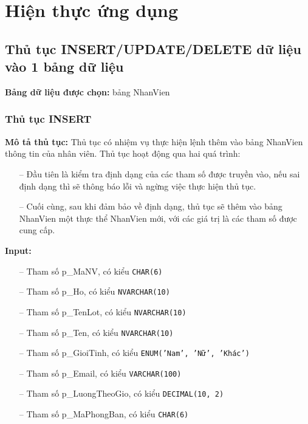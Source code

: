 \section{Hiện thực ứng dụng}
\subsection{Thủ tục INSERT/UPDATE/DELETE dữ liệu vào 1 bảng dữ liệu}
\textbf{Bảng dữ liệu được chọn:} bảng NhanVien 
\subsubsection{Thủ tục INSERT}

\textbf{Mô tả thủ tục:} Thủ tục có nhiệm vụ thực hiện lệnh thêm vào bảng NhanVien thông tin của nhân viên. Thủ tục hoạt động qua hai quá trình: 
\begin{itemize}
    \item [--] Đầu tiên là kiểm tra định dạng của các tham số được truyền vào, nếu sai định dạng thì sẽ thông báo lỗi và ngừng việc thực hiện thủ tục.
    \item [--] Cuối cùng, sau khi đảm bảo về định dạng, thủ tục sẽ thêm vào bảng NhanVien một thực thể NhanVien mới, với các giá trị là các tham số được cung cấp.
\end{itemize} 

\textbf{Input:} 
\begin{itemize}
    \item [--] Tham số p\_MaNV, có kiểu \texttt{CHAR(6)} 
    \item [--] Tham số p\_Ho, có kiểu \texttt{NVARCHAR(10)} 
    \item [--] Tham số p\_TenLot, có kiểu \texttt{NVARCHAR(10)} 
    \item [--] Tham số p\_Ten, có kiểu \texttt{NVARCHAR(10)} 
    \item [--] Tham số p\_GioiTinh, có kiểu \texttt{ENUM('Nam', 'Nữ', 'Khác')} 
    \item [--] Tham số p\_Email, có kiểu \texttt{VARCHAR(100)} 
    \item [--] Tham số p\_LuongTheoGio, có kiểu \texttt{DECIMAL(10, 2)} 
    \item [--] Tham số p\_MaPhongBan, có kiểu \texttt{CHAR(6)} 
\end{itemize}

